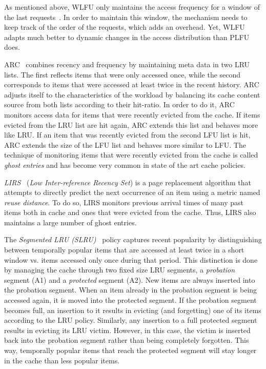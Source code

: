 \documentclass[10pt,a4paper]{article}
\begin{document}
As mentioned above, WLFU only maintains the access frequency for a window of the last  requests~\cite{WLFU}.
In order to maintain this window, the mechanism needs to keep track of the order of the requests, which adds an overhead.
Yet, WLFU adapts much better to dynamic changes in the access distribution than PLFU does.


ARC~\cite{ARC,ARCpatent} combines recency and frequency by maintaining meta data in two LRU lists.
The first reflects items that were only accessed once, while the second corresponds to items that were accessed at least twice in the recent history.
ARC adjusts itself to the characteristics of the workload by balancing its cache content source from both lists according to their hit-ratio.
In order to do it, ARC monitors access data for items that were recently evicted from the cache.
If items evicted from the LRU list are hit again, ARC extends this list and behaves more like LRU.
If an item that was recently evicted from the second LFU list is hit, ARC extends the size of the LFU list and behaves more similar to LFU.
The technique of monitoring items that were recently evicted from the cache is called \emph{ghost entries} and has become very common in state of the art cache policies.

\emph{LIRS}~\cite{LIRS} (\emph{Low Inter-reference Recency Set}) is a page replacement algorithm that attempts to directly predict the next occurrence of an item using a metric named \emph{reuse distance}.
To do so, LIRS monitors previous arrival times of many past items both in cache and ones that were evicted from the cache.
Thus, LIRS also maintains a large number of ghost entries.

The \emph{Segmented LRU (SLRU)}~\cite{SLRU} policy captures recent popularity by distinguishing between temporally popular items that are accessed at least twice in a short window vs. items accessed only once during that period.
This distinction is done by managing the cache through two fixed size LRU segments, a \emph{probation} segment (A1) and a \emph{protected} segment (A2).
New items are always inserted into the probation segment.
When an item already in the probation segment is being accessed again, it is moved into the protected segment.
If the probation segment becomes full, an insertion to it results in evicting (and forgetting) one of its items according to the LRU policy.
Similarly, any insertion to a full protected segment results in evicting its LRU victim.
However, in this case, the victim is inserted back into the probation segment rather than being completely forgotten.
This way, temporally popular items that reach the protected segment will stay longer in the cache than less popular items.
\end{document}
